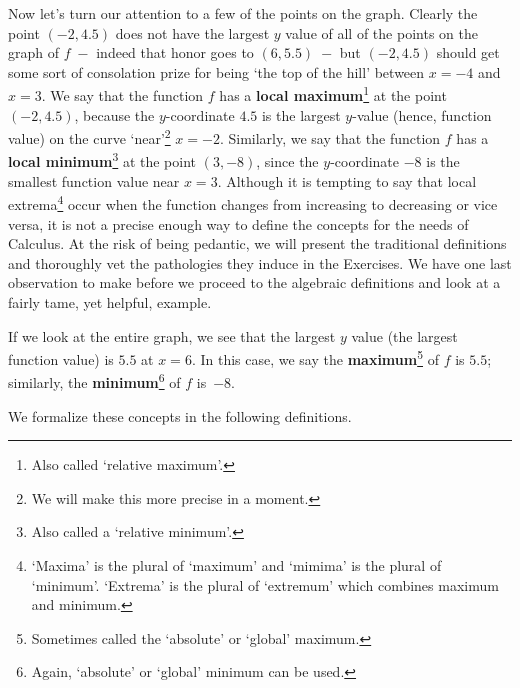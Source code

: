 Now let's turn our attention to a few of the points on the graph.  Clearly the point $(-2, 4.5)$ does not have the largest $y$ value of all of the points on the graph of $f\; -$ indeed that honor goes to $(6, 5.5)\; -$ but $(-2, 4.5)$ should get some sort of consolation prize for being `the top of the hill' between $x = -4$ and $x = 3$.  We say that the function $f$ has a \textbf{local maximum}\footnote{Also called `relative maximum'.} at the point $(-2,4.5)$, because the $y$-coordinate $4.5$ is the largest $y$-value (hence, function value) on the curve `near'\footnote{We will make this more precise in a moment.} $x=-2$.  Similarly, we say that the function $f$ has a \textbf{local minimum}\footnote{Also called a `relative minimum'.} at the point $(3,-8)$, since the $y$-coordinate $-8$ is the smallest function value near $x=3$.  Although it is tempting to say that local extrema\footnote{`Maxima' is the plural of `maximum' and `mimima' is the plural of `minimum'.  `Extrema' is the plural of `extremum' which combines maximum and minimum.} occur when the function changes from increasing to decreasing or vice versa, it is not a precise enough way to define the concepts for the needs of Calculus.  At the risk of being pedantic, we will present the traditional definitions and thoroughly vet the pathologies they induce in the Exercises. We have one last observation to make before we proceed to the algebraic definitions and look at a fairly tame, yet helpful, example.

\smallskip

If we look at the entire graph, we see that the largest $y$ value (the largest function value) is $5.5$ at $x=6$.  In this case, we say the \textbf{maximum}\footnote{Sometimes called the `absolute' or `global' maximum.} of $f$ is $5.5$;  similarly, the \textbf{minimum}\footnote{Again, `absolute' or `global' minimum can be used.} of $f$ is~$-8$.  

We formalize these concepts in the following definitions.

\medskip


